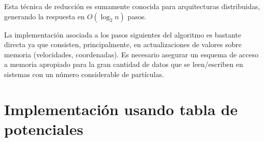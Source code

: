 Esta técnica de reducción es sumamente conocida para arquitecturas distribuidas, generando la respuesta en $O(\log_2{n})$ pasos.

La implementación asociada a los pasos siguientes del algoritmo es bastante directa ya que consisten, principalmente, en actualizaciones de valores sobre memoria (velocidades, coordenadas). 
Es necesario asegurar un esquema de acceso a memoria apropiado para la gran cantidad de datos que se leen/escriben en sistemas con un número considerable de partículas.  


\section{Implementación usando tabla de potenciales}

% 


